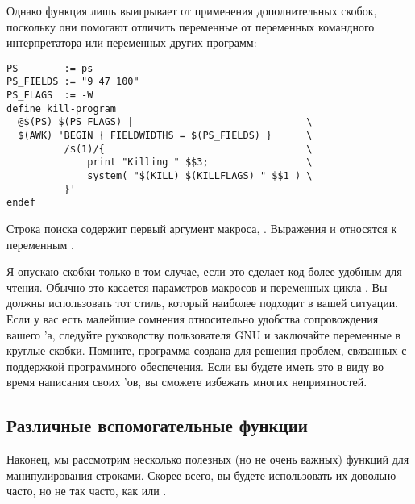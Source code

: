 Однако функция  лишь выигрывает от применения
дополнительных скобок, поскольку они помогают отличить переменные
\GNUmake{} от переменных командного интерпретатора или переменных
других программ:

{\footnotesize
\begin{verbatim}
PS        := ps
PS_FIELDS := "9 47 100"
PS_FLAGS  := -W
define kill-program
  @$(PS) $(PS_FLAGS) |                              \
  $(AWK) 'BEGIN { FIELDWIDTHS = $(PS_FIELDS) }      \
          /$(1)/{                                   \
              print "Killing " $$3;                 \
              system( "$(KILL) $(KILLFLAGS) " $$1 ) \
          }'
endef
\end{verbatim}
}

Строка поиска содержит первый аргумент макроса, .
Выражения  и  относятся к
переменным .

Я опускаю скобки только в том случае, если это сделает код более
удобным для чтения. Обычно это касается параметров макросов и
переменных цикла \function{foreach}. Вы должны использовать тот стиль,
который наиболее подходит в вашей ситуации. Если у вас есть малейшие
сомнения относительно удобства сопровождения вашего \Makefile{}'а,
следуйте руководству пользователя GNU \GNUmake{} и заключайте
переменные в круглые скобки. Помните, программа \GNUmake{} создана для
решения проблем, связанных с поддержкой программного обеспечения. Если
вы будете иметь это в виду во время написания своих \Makefile{}'ов, вы
сможете избежать многих неприятностей.

\subsection{Различные вспомогательные функции}
\label{sec:misc_func}

Наконец, мы рассмотрим несколько полезных (но не очень важных) функций
для манипулирования строками. Скорее всего, вы будете использовать их
довольно часто, но не так часто, как  или
\function{call}.


